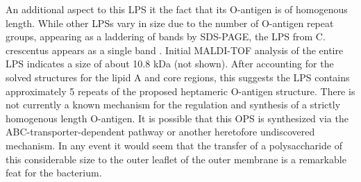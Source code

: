 	An additional aspect to this \ac{LPS} it the fact that its O-antigen is of homogenous length. While other \ac{LPS}s vary in size due to the number of O-antigen repeat groups, appearing as a laddering of bands by \ac{SDS-PAGE}, the \ac{LPS} from C. crescentus appears as a single band . Initial \ac{MALDI-TOF} analysis of the entire \ac{LPS} indicates a size of about 10.8 kDa (not shown).  After accounting for the solved structures for the lipid A and core regions, this suggests the \ac{LPS} contains approximately 5 repeats of the proposed heptameric O-antigen structure.  There is not currently a known mechanism for the regulation and synthesis of a strictly homogenous length O-antigen. It is possible that this \ac{OPS} is synthesized via the \ac{ABC}-transporter-dependent pathway  or another heretofore undiscovered mechanism. In any event it would seem that the transfer of a polysaccharide of this considerable size to the outer leaflet of the outer membrane is a remarkable feat for the bacterium.
 





 




